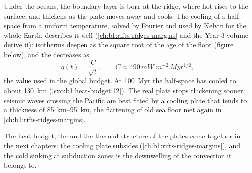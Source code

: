 Under the oceans, the boundary layer is born at the ridge, where hot 
rises to the surface, and thickens as the plate moves away and cools. The
cooling of a half-space from a uniform temperature, solved by Fourier and used
by Kelvin for the whole Earth, describes it well (\cref{ch:b1:rifts-ridges-margins}
and the Year 3 volume derive it): isotherms deepen as the square root of the
age of the floor (figure below), and the 
decreases as
\[
  q(t) = \frac{C}{\sqrt t}, \qquad C \approx \qty{490}{mW.m^{-2}.Myr^{1/2}},
\]
the value used in the global budget. %
At \qty{100}{Myr} the half-space has cooled to about \qty{130}{km} (\cref{exo:b1:heat-budget:12}). The real plate stops thickening sooner: seismic waves crossing the Pacific
are best fitted by a cooling plate that tends to a thickness of
\qtyrange{85}{95}{km}, the flattening of old sea floor met again in
\cref{ch:b1:rifts-ridges-margins}.

The heat budget, the  and the thermal structure of the plates come
together in the next chapters: the cooling plate subsides
(\cref{ch:b1:rifts-ridges-margins}), and the cold  sinking at
subduction zones is the downwelling of the convection it belongs to.

